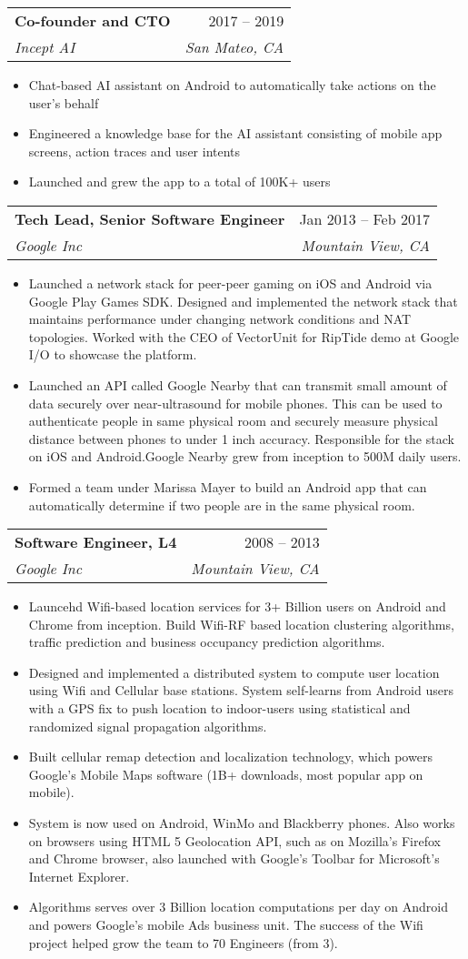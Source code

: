 \documentclass[letterpaper,10pt]{article}
\makeatletter
\newcommand{\resumeItem}[1]{
  \item\small{
    {#1 \vspace{-2pt}}
  }
}
\newcommand{\resumeSubheading}[4]{
  \vspace{-2pt}\item
    \begin{tabular*}{0.97\textwidth}[t]{l@{\extracolsep{\fill}}r}
      \textbf{#1} & #2 \\
      \textit{\small#3} & \textit{\small #4} \\
    \end{tabular*}\vspace{-7pt}
}
\newcommand{\resumeItemListStart}{\begin{itemize}}
\newcommand{\resumeItemListEnd}{\end{itemize}\vspace{-5pt}}
\makeatother
\begin{document}
    \resumeSubheading
      {Co-founder and CTO}{2017 -- 2019}
      {Incept AI}{San Mateo, CA}
      \resumeItemListStart
        \resumeItem{Chat-based AI assistant on Android to automatically take actions on the user's behalf}
        \resumeItem{Engineered a knowledge base for the AI assistant consisting of mobile app screens, action traces and user intents}
        \resumeItem{Launched and grew the app to a total of 100K+ users}
    \resumeItemListEnd

    \resumeSubheading
      {Tech Lead, Senior Software Engineer}{Jan 2013 -- Feb 2017}
      {Google Inc}{Mountain View, CA}
      \resumeItemListStart
        \resumeItem{Launched a network stack for peer-peer gaming on iOS and Android via Google Play Games SDK. Designed and implemented the network stack that maintains performance under changing network conditions and NAT topologies. Worked with the CEO of VectorUnit for RipTide
        demo at Google I/O to showcase the platform.}
        \resumeItem{Launched an API called Google Nearby that can transmit small amount of data securely over near-ultrasound for mobile phones. This can
        be used to authenticate people in same physical room and securely measure physical distance
        between phones to under 1 inch accuracy. Responsible for the stack on iOS and Android.Google Nearby grew from inception to 500M daily users.}
        \resumeItem{Formed a team under Marissa Mayer to build an Android app that can automatically determine if two people are in the same physical room.}
      \resumeItemListEnd

    \resumeSubheading
      {Software Engineer, L4}{2008 -- 2013}
      {Google Inc}{Mountain View, CA}
      \resumeItemListStart
        \resumeItem{Launcehd Wifi-based location services for 3+ Billion users on Android and Chrome from inception. Build Wifi-RF based location clustering algorithms, traffic prediction and business occupancy prediction algorithms.}
        \resumeItem{Designed and implemented a distributed system to compute user location using Wifi and Cellular base stations. System self-learns from Android users with a GPS fix to push location to indoor-users using statistical and randomized signal propagation algorithms.}
        \resumeItem{Built cellular remap detection and localization technology, which powers Google's Mobile Maps software (1B+ downloads, most popular app on mobile).}
        \resumeItem{System is now used on Android, WinMo and Blackberry phones. Also works on browsers using HTML 5 Geolocation API, such as on Mozilla's Firefox and Chrome browser, also launched with Google's Toolbar for Microsoft's Internet Explorer.}
        \resumeItem{Algorithms serves over 3 Billion location computations per day on Android and powers Google's mobile Ads business unit. The success of the Wifi project helped grow the team to 70 Engineers (from 3).}
      \resumeItemListEnd
\end{document}
